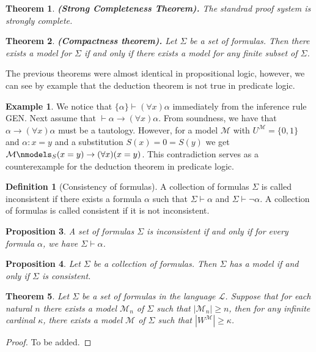 \documentclass[11pt,a4paper]{article}
\theoremstyle{definition}
\newtheorem{definition}{Definition}[section]
\newtheorem{example}{Example}[section]
\theoremstyle{plain}
\newtheorem{theorem}{Theorem}[section]
\newtheorem{proposition}[theorem]{Proposition}
\newcommand{\M}{\mathcal{M}}
\renewcommand{\L}{\mathcal{L}}
\renewcommand{\tt}[1]{\textnormal{\textbf{(#1).}}} %
\renewcommand{\implies}{\rightarrow}
\begin{document}
  \begin{theorem}\tt{Strong Completeness Theorem}
    The standrad proof system is strongly complete.
  \end{theorem}

  \begin{theorem}\tt{Compactness theorem}
    Let $\Sigma$ be a set of formulas.
    Then there exists a model for $\Sigma$ if and only if
    there exists a model for any finite subset of $\Sigma$.
  \end{theorem}

  The previous theorems were almost identical in propositional logic,
  however, we can see by example that the deduction theorem is not
  true in predicate logic.

  \begin{example}
    We notice that $\{\alpha\} \vdash (\forall x) \alpha$ immediately
    from the inference rule GEN.
    Next assume that $\vdash \alpha \implies (\forall x) \alpha$.
    From soundness, we have that $\alpha \implies (\forall x) \alpha$
    must be a tautology.
    However, for a model $\M$ with $U^\M = \{0,1\}$ and 
    $\alpha \colon x = y$ and a substitution $S(x) = 0 = S(y)$ we get
    $\M \nmodels_S (x = y) \implies (\forall x)(x = y)$.
    This contradiction serves as a counterexample for the deduction theorem
    in predicate logic.
  \end{example}

  \begin{definition}[Consistency of formulas]
    A collection of formulas $\Sigma$ is called inconsistent if there 
    exists a formula $\alpha$ such that $\Sigma \vdash \alpha$ and
    $\Sigma \vdash \neg \alpha$.
    A collection of formulas is called consistent if it is not inconsistent.
  \end{definition}
  
  \begin{proposition}
    A set of formulas $\Sigma$ is inconsistent if and only if for every 
    formula $\alpha$, we have $\Sigma \vdash \alpha$.
  \end{proposition}

  \begin{proposition}
    Let $\Sigma$ be a collection of formulas.
    Then $\Sigma$ has a model if and only if $\Sigma$ is consistent.
  \end{proposition}

  \begin{theorem}\label{thm:finite-infinite}
    Let $\Sigma$ be a set of formulas in the language $\L$.
    Suppose that for each natural $n$ there exists a model $\M_n$ of 
    $\Sigma$ such that $|\M_n| \geq n$, 
    then for any infinite cardinal $\kappa$, there exists a model 
    $\M$ of $\Sigma$ such that $|W^\M| \geq \kappa$.
  \end{theorem}
  \begin{proof}
    To be added.
  \end{proof}
\end{document}
